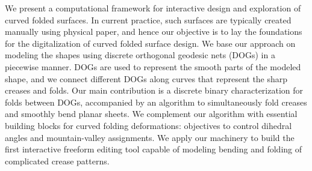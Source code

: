 We present a computational framework for interactive design and exploration of curved folded surfaces. In current practice, such surfaces are typically created manually using physical paper, and hence our objective is to lay the foundations for the digitalization of curved folded surface design.
We base our approach on modeling the shapes using discrete orthogonal geodesic nets (DOGs) in a piecewise manner. DOGs are used to represent the smooth parts of the modeled shape, and we connect different DOGs along curves that represent the sharp creases and folds.
Our main contribution is a discrete binary characterization for folds between DOGs, accompanied by an algorithm to simultaneously fold creases and smoothly bend planar sheets. We complement our algorithm with essential building blocks for curved folding deformations: objectives to control dihedral angles and mountain-valley assignments. We apply our machinery to build the first interactive freeform editing tool capable of modeling bending and folding
of complicated crease patterns.